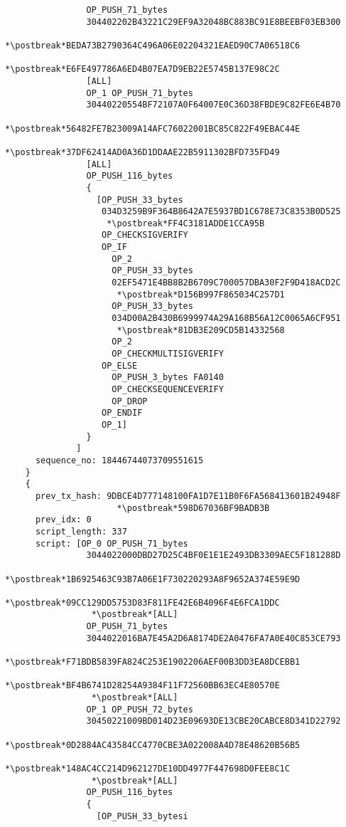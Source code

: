 \begin{lstlisting}
                OP_PUSH_71_bytes
                304402202B43221C29EF9A32048BC883BC91E8BEEBF03EB300
                 *\postbreak*BEDA73B2790364C496A06E02204321EAED90C7A06518C6
                 *\postbreak*E6FE497786A6ED4B07EA7D9EB22E5745B137E98C2C
                [ALL]
                OP_1 OP_PUSH_71_bytes
                30440220554BF72107A0F64007E0C36D38FBDE9C82FE6E4B70
                 *\postbreak*56482FE7B23009A14AFC76022001BC85C822F49EBAC44E
                 *\postbreak*37DF62414AD0A36D1DDAAE22B5911302BFD735FD49
                [ALL]
                OP_PUSH_116_bytes
                {
                  [OP_PUSH_33_bytes
                   034D3259B9F364B8642A7E5937BD1C678E73C8353B0D525
                    *\postbreak*FF4C3181ADDE1CCA95B
                   OP_CHECKSIGVERIFY
                   OP_IF
                     OP_2
                     OP_PUSH_33_bytes
                     02EF5471E4BB8B2B6709C700057DBA30F2F9D418ACD2C
                      *\postbreak*D156B997F865034C257D1
                     OP_PUSH_33_bytes
                     034D00A2B430B6999974A29A168B56A12C0065A6CF951
                      *\postbreak*81DB3E209CD5B14332568
                     OP_2
                     OP_CHECKMULTISIGVERIFY
                   OP_ELSE
                     OP_PUSH_3_bytes FA0140
                     OP_CHECKSEQUENCEVERIFY
                     OP_DROP
                   OP_ENDIF
                   OP_1]
                }
              ]
      sequence_no: 18446744073709551615
    }
    {
      prev_tx_hash: 9DBCE4D777148100FA1D7E11B0F6FA568413601B24948F
                      *\postbreak*598D67036BF9BADB3B
      prev_idx: 0
      script_length: 337
      script: [OP_0 OP_PUSH_71_bytes
                3044022000DBD27D25C4BF0E1E1E2493DB3309AEC5F181288D
                 *\postbreak*1B6925463C93B7A06E1F730220293A8F9652A374E59E9D
                 *\postbreak*09CC129DD5753D83F811FE42E6B4096F4E6FCA1DDC
                 *\postbreak*[ALL]
                OP_PUSH_71_bytes
                3044022016BA7E45A2D6A8174DE2A0476FA7A0E40C853CE793
                 *\postbreak*F71BDB5839FA824C253E1902206AEF00B3DD3EA8DCEBB1
                 *\postbreak*BF4B6741D28254A9384F11F72560BB63EC4E80570E
                 *\postbreak*[ALL]
                OP_1 OP_PUSH_72_bytes
                30450221009BD014D23E09693DE13CBE20CABCE8D341D22792
                 *\postbreak*0D2884AC43584CC4770CBE3A022008A4D78E48620B56B5
                 *\postbreak*148AC4CC214D962127DE10DD4977F447698D0FEE8C1C
                 *\postbreak*[ALL]
                OP_PUSH_116_bytes
                {
                  [OP_PUSH_33_bytesi

\end{lstlisting}
